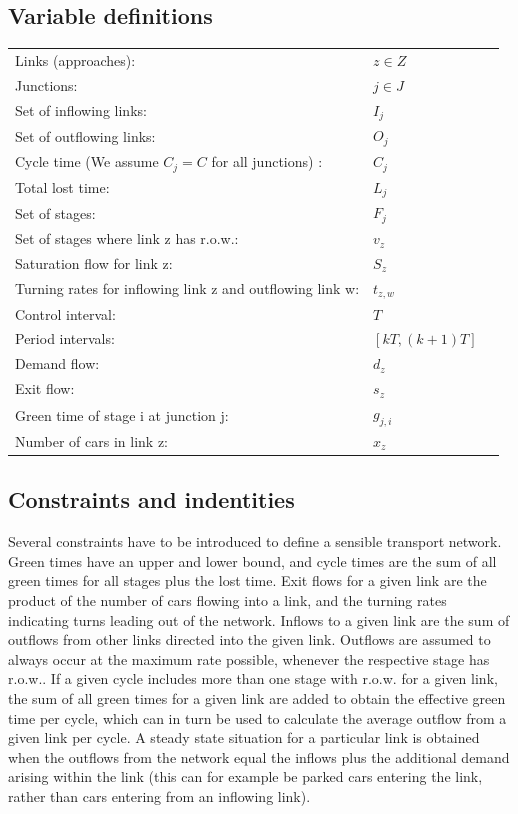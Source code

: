 \documentclass[11pt]{article}
\begin{document}
\subsection{Variable definitions}
\begin{tabular}{ l l c }
Links (approaches): & $z \in Z$  &\\
Junctions: & $j \in J$ &\\
Set of inflowing links: & $I_j$ &\\
Set of outflowing links: & $O_j$ &\\
Cycle time (We assume $C_j = C$ for all junctions) : & $C_j$ & \\
Total lost time: &$L_j$ &\\
Set of stages: & $F_j$ &\\
Set of stages where link z has r.o.w.: & $v_z$ &\\
Saturation flow for link z: & $S_z$ &\\
Turning rates for inflowing link z and outflowing link w: & $t_{z,w}$ &\\
Control interval: & $T$ &\\
Period intervals: & $[k T,(k+1) T]$ &\\
Demand flow: & $d_z$ &\\
Exit flow: & $ s_z $ &\\
Green time of stage i at junction j: & $g_{j,i}$ &\\
Number of cars in link z: & $x_{z}$ & \\
\end{tabular}
\subsection{Constraints and indentities}
Several constraints have to be introduced to define a sensible transport network. Green times have an upper and lower bound, and cycle times are the sum of all green times for all stages plus the lost time. Exit flows for a given link are the product of the number of cars flowing into a link, and the turning rates indicating turns leading out of the network. Inflows to a given link are the sum of outflows from other links directed into the given link. Outflows are assumed to always occur at the maximum rate possible, whenever the respective stage has r.o.w.. If a given cycle includes more than one stage with r.o.w. for a given link, the sum of all green times for a given link are added to obtain the effective green time per cycle, which can in turn be used to calculate the average outflow from a given link per cycle. A steady state situation for a particular link is obtained when the outflows from the network equal the inflows plus the additional demand arising within the link (this can for example be parked cars entering the link, rather than cars entering from an inflowing link).
\end{document}
